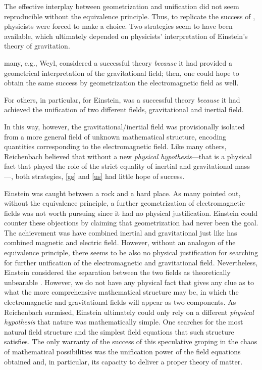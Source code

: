 \documentclass[draft]{article}
\begin{document}
The effective interplay between geometrization and unification did not seem reproducible without the equivalence principle. Thus, to replicate the success of \gr, physicists were forced to make a choice. Two strategies seem to have been available, which ultimately depended on physicists' interpretation of Einstein's theory of gravitation. \begin{inparaenum}[(a)] \item \label{gs} many, e.g., Weyl, considered \gr a successful theory \emph{because} it had provided a geometrical interpretation of the gravitational field; then, one could hope to obtain the same success by geometrization the electromagnetic field as well. \item \label{us} For others, in particular, for Einstein, \gr was a successful theory \emph{because} it had achieved the unification of two different fields, gravitational and inertial field. \end{inparaenum} In this way, however, the gravitational/inertial field was provisionally isolated from a more general field of unknown mathematical structure, encoding quantities corresponding to the electromagnetic field. Like many others, Reichenbach believed that without a new \emph{physical hypothesis}---that is a physical fact that played the role of the strict equality of inertial and gravitational mass---, both strategies, \cref{gs} and \cref{us} had little hope of success.

Einstein was caught between a rock and a hard place. As many pointed out, without the equivalence principle, a further geometrization of electromagnetic fields was not worth pursuing since it had no physical justification. Einstein could counter these objections by claiming that geometrization had never been the goal. The achievement \gr was have combined inertial and gravitational just like \sr has combined magnetic and electric field. However, without an analogon of the equivalence principle, there seems to be also no physical justification for searching for further unification of the electromagnetic and gravitational field.
Nevertheless, Einstein considered the separation between the two fields as theoretically unbearable \citep[24]{Einstein1930i}. However, we do not have any physical fact that gives any clue as to what the more comprehensive mathematical structure may be, in which the electromagnetic and gravitational fields will appear as two components. As Reichenbach surmised, Einstein ultimately could only rely on a different \emph{physical hypothesis} that nature was mathematically simple. One searches for the most natural field structure and the simplest field equations that such structure satisfies. The only warranty of the success of this speculative groping in the chaos of mathematical possibilities was the unification power of the field equations obtained and, in particular, its capacity to deliver a proper theory of matter.
\end{document}
